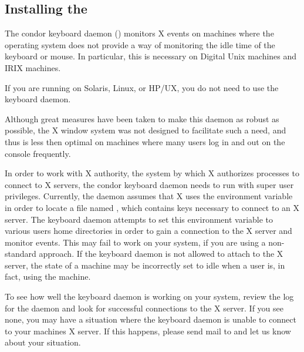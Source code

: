 \subsection{Installing the }
\label{sec:kbdd}

The condor keyboard daemon () monitors X events on
machines where the operating system does not provide a way of
monitoring the idle time of the keyboard or mouse.  In particular,
this is necessary on Digital Unix machines and IRIX machines.  

\Note If you are running on Solaris, Linux, or HP/UX, you do
not need to use the keyboard daemon.

Although great measures have been taken to make this daemon as robust
as possible, the X window system was not designed to facilitate such a
need, and thus is less then optimal on machines where many users log
in and out on the console frequently.

In order to work with X authority, the system by which X authorizes
processes to connect to X servers, the condor keyboard daemon needs to
run with super user privileges.  Currently, the daemon assumes that X
uses the  environment variable in order to locate a file
named , which contains keys necessary to connect to
an X server.  The keyboard daemon attempts to set this environment
variable to various users home directories in order to gain a
connection to the X server and monitor events.  This may fail to work
on your system, if you are using a non-standard approach.  If the
keyboard daemon is not allowed to attach to the X server, the state of
a machine may be incorrectly set to idle when a user is, in fact,
using the machine.

To see how well the keyboard daemon is working on your system, review
the log for the daemon and look for successful connections to the X
server.  If you see none, you may have a situation where the keyboard
daemon is unable to connect to your machines X server.  If this
happens, please send mail to  and let
us know about your situation.

